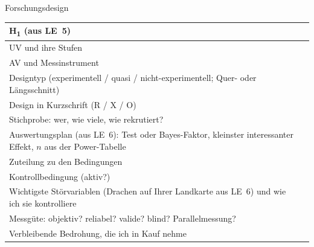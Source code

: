 \begin{uebungsblatt}{Forschungsdesign}
\begin{center}
\renewcommand{\arraystretch}{1.5}
\begin{tabular}{|p{}|p{}|}
\hline
H\textsubscript{1} (aus LE~5) & \\[6mm] \hline
UV und ihre Stufen & \\ \hline
AV und Messinstrument & \\ \hline
Designtyp (experimentell / quasi / nicht-experimentell; Quer- oder Längsschnitt) & \\ \hline
Design in Kurzschrift (R / X / O) & \\ \hline
Stichprobe: wer, wie viele, wie rekrutiert? & \\ \hline
Auswertungsplan (aus LE~6): Test oder Bayes-Faktor, kleinster interessanter Effekt, $n$ aus der Power-Tabelle & \\[6mm] \hline
Zuteilung zu den Bedingungen & \\ \hline
Kontrollbedingung (aktiv?) & \\ \hline
Wichtigste Störvariablen (Drachen auf Ihrer Landkarte aus LE~6) und wie ich sie kontrolliere & \\[8mm] \hline
Messgüte: objektiv? reliabel? valide? blind? Parallelmessung? & \\[8mm] \hline
Verbleibende Bedrohung, die ich in Kauf nehme & \\ \hline
\end{tabular}
\end{center}
\end{uebungsblatt}

